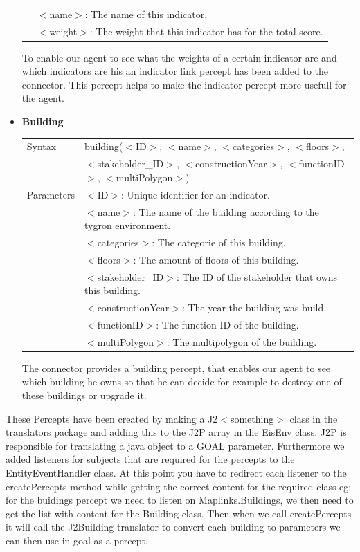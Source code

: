 \begin{itemize}
\begin{tabular}{ l l }
				\\& $<$name$>$: The name of this indicator. 
				\\& $<$weight$>$: The weight that this indicator has for the total score. 
	\end{tabular}
	To enable our agent to see what the weights of a certain indicator are and which indicators are his an indicator link percept has been added to the connector. This percept helps to make the indicator percept more usefull for the agent.
	\item \textbf{Building} \\ 
	\begin{tabular}{ l l }
 		 Syntax & building($<$ID$>$, $<$name$>$, $<$categories$>$, $<$floors$>$, \\
		& $<$stakeholder\_ID$>$, $<$constructionYear$>$, $<$functionID$>$, $<$multiPolygon$>$) \\
  		Parameters &  $<$ID$>$: Unique identifier for an indicator. 
				\\& $<$name$>$: The name of the building according to the tygron environment.
				\\& $<$categories$>$: The categorie of this building.
				\\& $<$floors$>$: The amount of floors of this building.
				\\& $<$stakeholder\_ID$>$: The ID of the stakeholder that owns this building.
				\\& $<$constructionYear$>$: The year the building was build.
				\\& $<$functionID$>$: The function ID of the building.
				\\& $<$multiPolygon$>$: The multipolygon of the building.
	\end{tabular}
	The connector provides a building percept, that enables our agent to see which building he owns so that he can decide for example to destroy one of these buildings or upgrade it.

\end{itemize}

These Percepts have been created by making a J2$<$something$>$ class in the translators package and adding this to the J2P array in the EisEnv class. J2P is responsible for translating a java object to a GOAL parameter. Furthermore we added listeners for subjects that are required for the percepts to the EntityEventHandler class. At this point you have to redirect each listener to the createPercepts method while getting the correct content for the required class eg: for the buidings percept we need to listen on Maplinks.Buildings, we then need to get the list with content for the Building class. Then when we call createPercepts it will call the J2Building translator to convert each building to parameters we can then use in goal as a percept.

